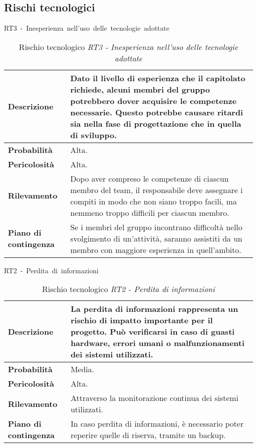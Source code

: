\begin{table}[!h]
    \subsection{Rischi tecnologici}
    \centering
    \hbox{RT3 - Inesperienza nell'uso delle tecnologie adottate}
    \vspace{0.3cm}
	\begin{tabular}{|l|p{10cm}|} 
		\hline
		\textbf{Descrizione} & Dato il livello di esperienza che il capitolato richiede,  alcuni membri del gruppo potrebbero dover acquisire le competenze necessarie. Questo potrebbe causare ritardi sia nella fase di progettazione che in quella di sviluppo.  \\ 

        \hline
        \textbf{Probabilità} & Alta. \\
        \hline
        \textbf{Pericolosità} & Alta. \\
        \hline
        \textbf{Rilevamento} & Dopo aver compreso le competenze di ciascun membro del team, il responsabile deve assegnare i compiti in modo che non siano troppo facili, ma nemmeno troppo difficili per ciascun membro. \\
        \hline
        \textbf{Piano di contingenza} & Se i membri del gruppo incontrano difficoltà nello svolgimento di un'attività, saranno assistiti da un membro con maggiore esperienza in quell'ambito. \\
		\hline
	\end{tabular}
    \caption{Rischio tecnologico \textit{RT3 - Inesperienza nell'uso delle tecnologie adottate}}
    \label{table:5}
\end{table}

\begin{table}[!h]
    \centering
    \hbox{RT2 - Perdita di informazioni}
    \vspace{0.3cm}
	\begin{tabular}{|l|p{10cm}|} 
		\hline
		\textbf{Descrizione} & La perdita di informazioni rappresenta un rischio di impatto importante per il progetto. Può verificarsi in caso di guasti hardware, errori umani o malfunzionamenti dei sistemi utilizzati. \\ 
        \hline
        \textbf{Probabilità} & Media. \\
        \hline
        \textbf{Pericolosità} & Alta. \\
        \hline
        \textbf{Rilevamento} & Attraverso la monitorazione continua dei sistemi utilizzati. \\
        \hline
        \textbf{Piano di contingenza} & In caso perdita di informazioni, è necessario poter reperire quelle di riserva, tramite un backup. \\
		\hline
	\end{tabular}
    \caption{Rischio tecnologico \textit{RT2 - Perdita di informazioni}}
    \label{table:6}
\end{table}

